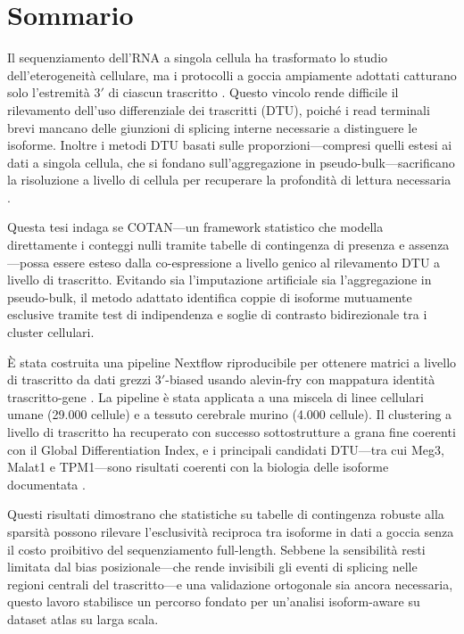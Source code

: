 \chapter*{Sommario}

Il sequenziamento dell'RNA a singola cellula ha trasformato lo studio dell'eterogeneità cellulare, ma i protocolli a goccia ampiamente adottati catturano solo l'estremità $3'$ di ciascun trascritto \cite{conte2024opportunities}. Questo vincolo rende difficile il rilevamento dell'uso differenziale dei trascritti (DTU), poiché i read terminali brevi mancano delle giunzioni di splicing interne necessarie a distinguere le isoforme. Inoltre i metodi DTU basati sulle proporzioni---compresi quelli estesi ai dati a singola cellula, che si fondano sull'aggregazione in pseudo-bulk---sacrificano la risoluzione a livello di cellula per recuperare la profondità di lettura necessaria \cite{gilis2021satuRn, patrick2020sierra}.

Questa tesi indaga se COTAN---un framework statistico che modella direttamente i conteggi nulli tramite tabelle di contingenza di presenza e assenza \cite{galfre2021cotan}---possa essere esteso dalla co-espressione a livello genico al rilevamento DTU a livello di trascritto. Evitando sia l'imputazione artificiale sia l'aggregazione in pseudo-bulk, il metodo adattato identifica coppie di isoforme mutuamente esclusive tramite test di indipendenza e soglie di contrasto bidirezionale tra i cluster cellulari.

È stata costruita una pipeline Nextflow riproducibile per ottenere matrici a livello di trascritto da dati grezzi $3'$-biased usando alevin-fry con mappatura identità trascritto-gene \cite{he2022alevin}. La pipeline è stata applicata a una miscela di linee cellulari umane (29.000 cellule) e a tessuto cerebrale murino (4.000 cellule). Il clustering a livello di trascritto ha recuperato con successo sottostrutture a grana fine coerenti con il Global Differentiation Index, e i principali candidati DTU---tra cui Meg3, Malat1 e TPM1---sono risultati coerenti con la biologia delle isoforme documentata \cite{joglekar2023words}.

Questi risultati dimostrano che statistiche su tabelle di contingenza robuste alla sparsità possono rilevare l'esclusività reciproca tra isoforme in dati a goccia senza il costo proibitivo del sequenziamento full-length. Sebbene la sensibilità resti limitata dal bias posizionale---che rende invisibili gli eventi di splicing nelle regioni centrali del trascritto---e una validazione ortogonale sia ancora necessaria, questo lavoro stabilisce un percorso fondato per un'analisi isoform-aware su dataset atlas su larga scala.
